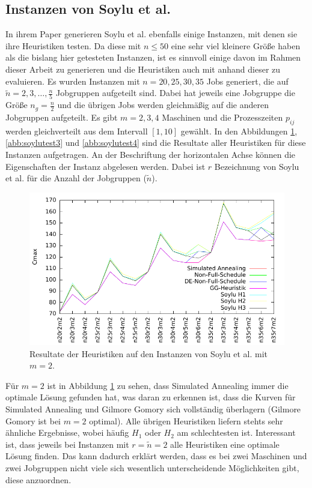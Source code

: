 \documentclass{scrreprt}
\begin{document}
\subsection{Instanzen von Soylu et al.}
In ihrem Paper \cite{soylu} generieren Soylu et al. ebenfalls einige Instanzen, mit denen sie ihre Heuristiken testen.
Da diese mit $n\leq 50$ eine sehr viel kleinere Größe haben als die bislang hier getesteten Instanzen, 
ist es sinnvoll einige davon im Rahmen dieser Arbeit zu generieren und die Heuristiken auch mit anhand dieser zu evaluieren.
Es wurden Instanzen mit $n=20,25,30,35$ Jobs generiert, die auf $\tilde{n}=2,3,\ldots,\frac{n}{5}$ Jobgruppen aufgeteilt sind.
Dabei hat jeweils eine Jobgruppe die Größe $n_g=\frac{n}{2}$ und die übrigen Jobs werden gleichmäßig auf die anderen Jobgruppen aufgeteilt.
Es gibt $m=2,3,4$ Maschinen und die Prozesszeiten $p_{ij}$ werden gleichverteilt aus dem Intervall $[1,10]$ gewählt.
In den Abbildungen \ref{abb:soylutest2}, \ref{abb:soylutest3} und \ref{abb:soylutest4} sind die Resultate aller Heuristiken für diese Instanzen aufgetragen.
An der Beschriftung der horizontalen Achse können die Eigenschaften der Instanz abgelesen werden.
Dabei ist $r$ Bezeichnung von Soylu et al. für die Anzahl der Jobgruppen ($\tilde{n}$).

\begin{figure}
    \begin{center}
        \includegraphics[width=.8\textwidth]{../instances/soylu/plotm2.pdf}
    \end{center}
    \caption{
        \label{abb:soylutest2}
        Resultate der Heuristiken auf den Instanzen von Soylu et al. mit $m=2$.
    }
\end{figure}
Für $m=2$ ist in Abbildung \ref{abb:soylutest2} zu sehen, dass Simulated Annealing immer die optimale Lösung gefunden hat, was daran zu erkennen ist,
dass die Kurven für Simulated Annealing und Gilmore Gomory sich vollständig überlagern (Gilmore Gomory ist bei $m=2$ optimal).
Alle übrigen Heuristiken liefern stehts sehr ähnliche Ergebnisse, wobei häufig $H_1$ oder $H_2$ am schlechtesten ist.
Interessant ist, dass jeweils bei Instanzen mit $r=\tilde{n}=2$ alle Heuristiken eine optimale Lösung finden.
Das kann dadurch erklärt werden, dass es bei zwei Maschinen und zwei Jobgruppen nicht viele sich wesentlich unterscheidende Möglichkeiten gibt, diese anzuordnen.
\end{document}
